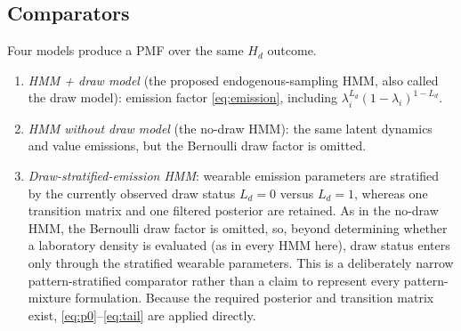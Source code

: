 \documentclass{ieeeaccess}
\begin{document}
\subsection{Comparators}
Four models produce a PMF over the same $H_d$ outcome.
\begin{enumerate}
\item \emph{HMM + draw model} (the proposed endogenous-sampling HMM, also called the draw model): emission factor \eqref{eq:emission}, including $\lambda_i^{L_d}(1-\lambda_i)^{1-L_d}$.
\item \emph{HMM without draw model} (the no-draw HMM): the same latent dynamics and value emissions, but the Bernoulli draw factor is omitted.
\item \emph{Draw-stratified-emission HMM}: wearable emission parameters are stratified by the currently observed draw status $L_d=0$ versus $L_d=1$, whereas one transition matrix and one filtered posterior are retained. As in the no-draw HMM, the Bernoulli draw factor is omitted, so, beyond determining whether a laboratory density is evaluated (as in every HMM here), draw status enters only through the stratified wearable parameters. This is a deliberately narrow pattern-stratified comparator rather than a claim to represent every pattern-mixture formulation. Because the required posterior and transition matrix exist, \eqref{eq:p0}--\eqref{eq:tail} are applied directly.

\end{enumerate}
\end{document}
